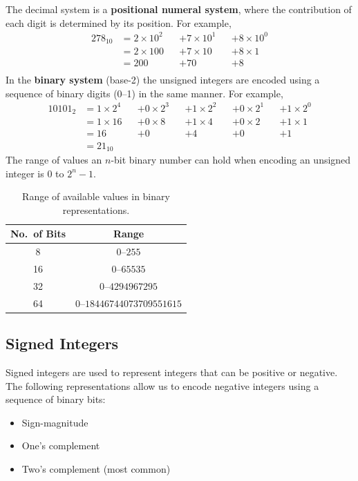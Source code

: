 \documentclass{article}
\begin{document}
The decimal system is a \textbf{positional numeral system}, where the contribution of each digit is determined by its position.
For example,
\begin{align*}
    278_{10} & = 2 \times 10^2 &  & + 7 \times 10^1 &  & + 8 \times 10^0 \\
             & = 2 \times 100  &  & + 7 \times 10   &  & + 8 \times 1    \\
             & = 200           &  & + 70            &  & + 8             \\
\end{align*}
In the \textbf{binary system} (base-2) the unsigned integers are encoded using a sequence of binary digits (0--1)
in the same manner. For example,
\begin{align*}
    10101_2 & = 1 \times 2^4 &  & + 0 \times 2^3 &  & + 1 \times 2^2 &  & + 0 \times 2^1 &  & + 1 \times 2^0 \\
            & = 1 \times 16  &  & + 0 \times 8   &  & + 1 \times 4   &  & + 0 \times 2   &  & + 1 \times 1   \\
            & = 16           &  & + 0            &  & + 4            &  & + 0            &  & + 1            \\
            & = 21_{10}
\end{align*}
The range of values an \(n\)-bit binary number can hold when encoding an unsigned integer is 0 to \(2^n - 1\).
\begin{table}[H]
    \centering
    \begin{tabular}{c c}
        \toprule
        \textbf{No.\ of Bits} & \textbf{Range}                        \\
        \midrule
        8                     & \(0\)--\(255\)                        \\
        16                    & \(0\)--\(\num{65535}\)                \\
        32                    & \(0\)--\(\num{4294967295}\)           \\
        64                    & \(0\)--\(\num{18446744073709551615}\) \\
        \bottomrule
    \end{tabular}
    \caption{Range of available values in binary representations.} %
\end{table}
\subsection{Signed Integers}
Signed integers are used to represent integers that can be positive or negative.
The following representations allow us to encode negative integers using a sequence of binary bits:
\begin{itemize}
    \item Sign-magnitude
    \item One's complement
    \item Two's complement (most common)
\end{itemize}
\end{document}
